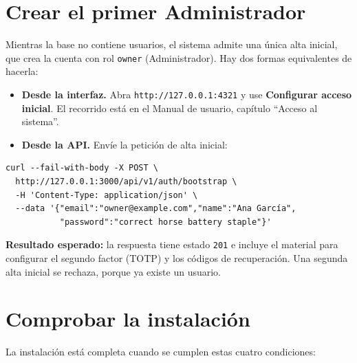 
\section{Crear el primer Administrador}\label{sec:inst-owner}

Mientras la base no contiene usuarios, el sistema admite una única alta
inicial, que crea la cuenta con rol \texttt{owner} (Administrador). Hay dos
formas equivalentes de hacerla:

\begin{itemize}
  \item \textbf{Desde la interfaz.} Abra \texttt{http://127.0.0.1:4321} y
        use \textbf{Configurar acceso inicial}. El recorrido está en el
        Manual de usuario, capítulo \enquote{Acceso al sistema}.
  \item \textbf{Desde la API.} Envíe la petición de alta inicial:
\end{itemize}

\begin{verbatim}
curl --fail-with-body -X POST \
  http://127.0.0.1:3000/api/v1/auth/bootstrap \
  -H 'Content-Type: application/json' \
  --data '{"email":"owner@example.com","name":"Ana García",
           "password":"correct horse battery staple"}'
\end{verbatim}

\textbf{Resultado esperado:} la respuesta tiene estado \texttt{201} e
incluye el material para configurar el segundo factor (TOTP) y los códigos
de recuperación. Una segunda alta inicial se rechaza, porque ya existe un
usuario.


\section{Comprobar la instalación}\label{sec:inst-comprobar}

La instalación está completa cuando se cumplen estas cuatro condiciones:

